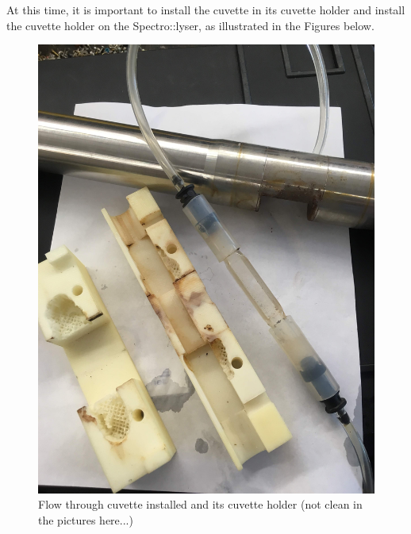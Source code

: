\documentclass[]{book}
\begin{document}
At this time, it is important to install the cuvette in its cuvette holder and install the cuvette holder on the Spectro::lyser, as illustrated in the Figures below.

\begin{figure}

{\centering \includegraphics[width=0.8\linewidth]{pictures/Cuvette1} 

}

\caption{Flow through cuvette installed and its cuvette holder (not clean in the pictures here...)}\label{fig:Cuvette1}
\end{figure}
\end{document}
